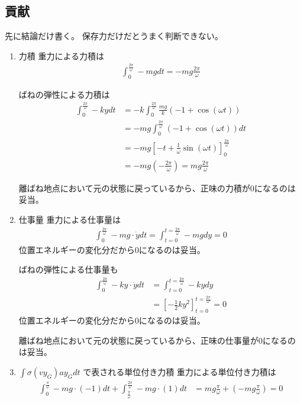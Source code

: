 \documentclass[a4paper,11pt]{jsarticle}
\begin{document}
\subsection{貢献}
先に結論だけ書く。
保存力だけだとうまく判断できない。
\begin{enumerate}
  \item 力積
  重力による力積は
  \begin{align}
    \int_0^{\frac{2\pi}{\omega}} -mg dt = -mg \frac{2\pi}{\omega}
  \end{align}

  ばねの弾性による力積は
  \begin{align}
    \int_0^{\frac{2\pi}{\omega}} -ky dt &= -k \int_0^{\frac{2\pi}{\omega}} \frac{mg}{k}\left(-1+\cos(\omega t)\right)
    \\ &= -mg \int_0^{\frac{2\pi}{\omega}} \left(-1+\cos(\omega t)\right) dt
    \\ &= -mg \left[-t+\frac{1}{\omega}\sin(\omega t)\right]_0^{\frac{2\pi}{\omega}}
    \\ &= -mg \left( -\frac{2\pi}{\omega} \right) = mg \frac{2\pi}{\omega}
  \end{align}

  離ばね地点において元の状態に戻っているから、正味の力積が0になるのは妥当。

  \item 仕事量
  重力による仕事量は
  \begin{align}
    \int_0^{\frac{2\pi}{\omega}} -mg\cdot\dot{y} dt = \int_{t=0}^{t=\frac{2\pi}{\omega}} -mg dy = 0
  \end{align}
  位置エネルギーの変化分だから0になるのは妥当。

  ばねの弾性による仕事量も
  \begin{align}
    \int_0^{\frac{2\pi}{\omega}} -ky \cdot\dot{y} dt
    &= \int_{t=0}^{t=\frac{2\pi}{\omega}} -kydy
    \\&= \left[-\frac{1}{2}ky^2\right]_{t=0}^{t=\frac{2\pi}{\omega}} = 0
  \end{align}
  位置エネルギーの変化分だから0になるのは妥当。

  離ばね地点において元の状態に戻っているから、正味の仕事量が0になるのは妥当。

  \item $\int\sigma (vy_G)ay_G dt$ で表される単位付き力積
  重力による単位付き力積は
  \begin{align}
    \int_0^{\frac{\pi}{\omega}} -mg\cdot(-1) dt + \int_{\frac{\pi}{\omega}}^{\frac{2\pi}{\omega}} -mg\cdot(1) dt
    &= mg\frac{\pi}{\omega} + \left(-mg\frac{\pi}{\omega}\right) = 0
  \end{align}


\end{enumerate}
\end{document}
